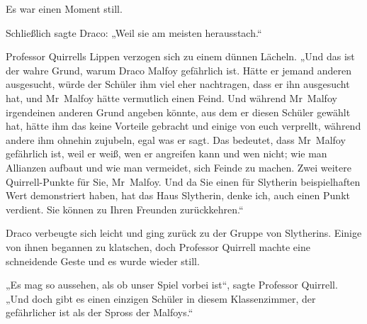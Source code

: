 Es war einen Moment still.

Schließlich sagte Draco:
„Weil sie am meisten herausstach.“

Professor Quirrells Lippen verzogen sich zu einem dünnen Lächeln.
„Und das ist der wahre Grund, warum Draco Malfoy gefährlich ist. Hätte er jemand anderen ausgesucht, würde der Schüler ihm viel eher nachtragen, dass er ihn ausgesucht hat, und Mr~Malfoy hätte vermutlich einen Feind. Und während Mr~Malfoy irgendeinen anderen Grund angeben könnte, aus dem er diesen Schüler gewählt hat, hätte ihm das keine Vorteile gebracht und einige von euch verprellt, während andere ihm ohnehin zujubeln, egal was er sagt. Das bedeutet, dass Mr~Malfoy gefährlich ist, weil er weiß, wen er angreifen kann und wen nicht; wie man Allianzen aufbaut und wie man vermeidet, sich Feinde zu machen. Zwei weitere Quirrell-Punkte für Sie, Mr~Malfoy. Und da Sie einen für Slytherin beispielhaften Wert demonstriert haben, hat das Haus Slytherin, denke ich, auch einen Punkt verdient. Sie können zu Ihren Freunden zurückkehren.“

Draco verbeugte sich leicht und ging zurück zu der Gruppe von Slytherins. Einige von ihnen begannen zu klatschen, doch Professor Quirrell machte eine schneidende Geste und es wurde wieder still.

„Es mag so aussehen, als ob unser Spiel vorbei ist“, sagte Professor Quirrell.
„Und doch gibt es einen einzigen Schüler in diesem Klassenzimmer, der gefährlicher ist als der Spross der Malfoys.“

